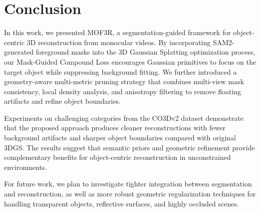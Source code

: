 \section{Conclusion}


In this work, we presented MOF3R, a segmentation-guided framework for object-centric 3D reconstruction from monocular videos. By incorporating SAM2-generated foreground masks into the 3D Gaussian Splatting optimization process, our Mask-Guided Compound Loss encourages Gaussian primitives to focus on the target object while suppressing background fitting. We further introduced a geometry-aware multi-metric pruning strategy that combines multi-view mask consistency, local density analysis, and anisotropy filtering to remove floating artifacts and refine object boundaries.

Experiments on challenging categories from the CO3Dv2 dataset demonstrate that the proposed approach produces cleaner reconstructions with fewer background artifacts and sharper object boundaries compared with original 3DGS. The results suggest that semantic priors and geometric refinement provide complementary benefits for object-centric reconstruction in unconstrained environments.

For future work, we plan to investigate tighter integration between segmentation and reconstruction, as well as more robust geometric regularization techniques for handling transparent objects, reflective surfaces, and highly occluded scenes.
